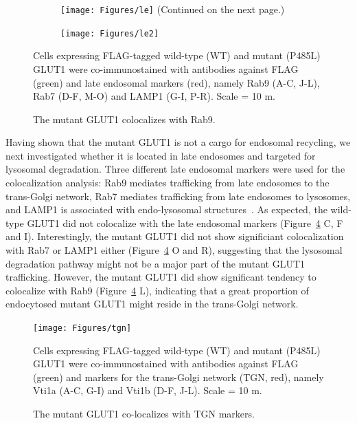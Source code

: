 \begin{figure}[h]
\centering
\begin{subfigure}[h]{\linewidth}
	\texttt{[image: Figures/le]}
	\label{fig:le1}
	\vspace*{-3mm}
	\small \justify
	\centering (Continued on the next page.)
\end{subfigure}
\end{figure}
\begin{figure}[h]\ContinuedFloat
\centering
\begin{subfigure}[h]{\linewidth}
	\texttt{[image: Figures/le2]}
	\label{fig:le2}
\end{subfigure}
\caption{The mutant GLUT1 colocalizes with Rab9.}
\vspace*{-3mm}
\small \justify
Cells expressing FLAG-tagged wild-type (WT) and mutant (P485L) GLUT1 were co-immunostained with antibodies against FLAG (green) and late endosomal markers (red), namely Rab9 (A-C, J-L), Rab7 (D-F, M-O) and LAMP1 (G-I, P-R). Scale = 10 \textmu m.
\label{fig:le}
\end{figure}
Having shown that the mutant GLUT1 is not a cargo for endosomal recycling, we next investigated whether it is located in late endosomes and targeted for lysosomal degradation. Three different late endosomal markers were used for the colocalization analysis: Rab9 mediates trafficking from late endosomes to the trans-Golgi network, Rab7 mediates trafficking from late endosomes to lysosomes, and LAMP1 is associated with endo-lysosomal structures~\cite{Stenmark,Saftig}. As expected, the wild-type GLUT1 did not colocalize with the late endosomal markers (Figure~\ref{fig:le} C, F and I). Interestingly, the mutant GLUT1 did not show significiant colocalization with Rab7 or LAMP1 either (Figure~\ref{fig:le} O and R), suggesting that the lysosomal degradation pathway might not be a major part of the mutant GLUT1 trafficking. However, the mutant GLUT1 did show significant tendency to colocalize with Rab9 (Figure~\ref{fig:le} L), indicating that a great proportion of endocytosed mutant GLUT1 might reside in the trans-Golgi network.
\begin{figure}[h]
\centering
\texttt{[image: Figures/tgn]}
\caption{The mutant GLUT1 co-localizes with TGN markers.}
\vspace*{-3mm}
\small \justify
Cells expressing FLAG-tagged wild-type (WT) and mutant (P485L) GLUT1 were co-immunostained with antibodies against FLAG (green) and markers for the trans-Golgi network (TGN, red), namely Vti1a (A-C, G-I) and Vti1b (D-F, J-L). Scale = 10 \textmu m.
\label{fig:tgn}
\end{figure}

